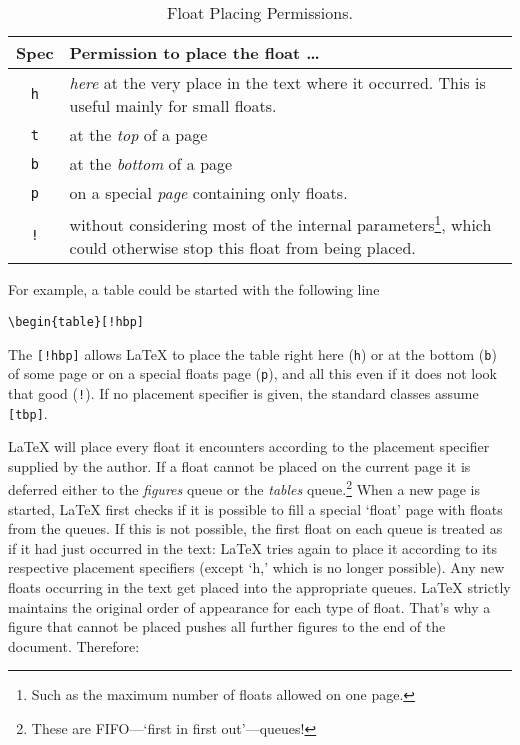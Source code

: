 \begin{table}[!bp]
\begin{minipage}{\textwidth}
\centering
\caption{Float Placing Permissions.}\label{tab:permiss}
\begin{tabular}{@{}cp{8cm}@{}}
  \toprule
Spec&Permission to place the float \ldots\\
\midrule
\texttt{h} & \emph{here} at the very place in the text
  where it occurred.  This is useful mainly for small floats.\\[0.3ex]
\texttt{t} & at the \emph{top} of a page\\[0.3ex]
\texttt{b} & at the \emph{bottom} of a page\\[0.3ex]
\texttt{p} & on a special \emph{page} containing only floats.\\[0.3ex]
\texttt{!} & without considering most of the  internal parameters\footnote{Such as the
    maximum number of floats allowed  on one page.}, which could otherwise stop this
  float from being placed. \\
  \bottomrule
\end{tabular}
\end{minipage}
\end{table}

For example, a table could be started with the following line
\begin{code}
\verb|\begin{table}[!hbp]|
\end{code}
\noindent The  \verb|[!hbp]| allows \LaTeX{} to
place the table right here (\texttt{h}) or at the bottom (\texttt{b})
of some page
or on a special floats page (\texttt{p}), and all this even if it does not
look that good (\texttt{!}). If no placement specifier is given, the standard
classes assume \verb|[tbp]|.

\LaTeX{} will place every float it encounters according to the
placement specifier supplied by the author. If a float cannot be
placed on the current page it is deferred either to the
\emph{figures} queue or the \emph{tables} queue.\footnote{These are FIFO---`first in first out'---queues!}  When a new page is started,
\LaTeX{} first checks if it is possible to fill a special `float'
page with floats from the queues. If this is not possible, the first
float on each queue is treated as if it had just occurred in the
text: \LaTeX{} tries again to place it according to its
respective placement specifiers (except `h,' which is no longer
possible).  Any new floats occurring in the text get placed into the
appropriate queues. \LaTeX{} strictly maintains the original order of
appearance for each type of float. That's why a figure that cannot
be placed pushes all further figures to the end of the document.
Therefore:

